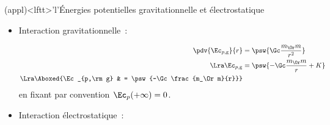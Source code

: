 \documentclass[../../main/main.tex]{subfiles}
\begin{document}
\begin{tcb*}(appl)<lftt>'l'{Énergies potentielles gravitationnelle et
	électrostatique}
	\begin{itemize}
		\item Interaction gravitationnelle~:
      \vspace{-15pt}
      \smallbreak
		      \begin{minipage}{0.45\linewidth}
			      \begin{align*}
				      \pdv{\Ec_{p,\rm g}}{r} & = \psw{\Gc \frac{m_\Or m}{r^2}}
				      \\\Lra
				      \Ec_{p,\rm g}          & = \psw{-\Gc \frac{m_\Or m}{r} + K}
				      \\\Lra
				      \Aboxed{\Ec_{p,\rm g}  & = \psw{-\Gc \frac{m_\Or m}{r}}}
			      \end{align*}
			      en fixant par convention $\Ec_p(+\infty) = 0$.
		      \end{minipage}
		      \hfill
		      \begin{minipage}{0.45\linewidth}
			      \begin{center}
              \vspace{-15pt}
			      \end{center}
		      \end{minipage}
		\item Interaction électrostatique~:
      \vspace{-15pt}

\end{itemize}
\end{tcb*}
\end{document}
